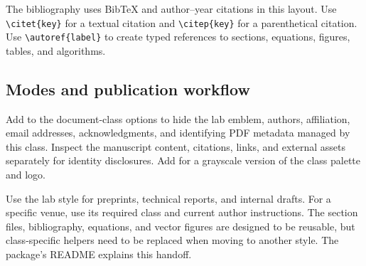 The bibliography uses BibTeX and author--year citations in this layout.
Use \verb|\citet{key}| for a textual citation and \verb|\citep{key}| for a
parenthetical citation. Use \verb|\autoref{label}| to create typed references
to sections, equations, figures, tables, and algorithms.

\subsection{Modes and publication workflow}
Add  to the document-class options to hide the lab emblem,
authors, affiliation, email addresses, acknowledgments, and identifying
PDF metadata managed by this class. Inspect the manuscript content,
citations, links, and external assets separately for identity disclosures.
Add  for a grayscale version of the class palette and logo.

Use the lab style for preprints, technical reports, and internal drafts.
For a specific venue, use its required class and current author instructions.
The section files, bibliography, equations, and vector figures are designed
to be reusable, but class-specific helpers need to be replaced when moving
to another style. The package's README explains this handoff.
